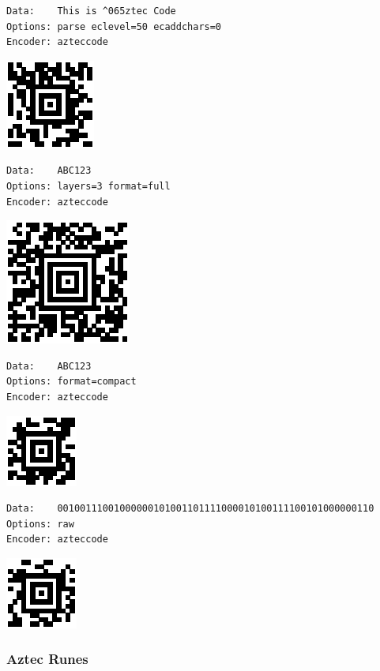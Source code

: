\begin{verbatim}
Data:    This is ^065ztec Code
Options: parse eclevel=50 ecaddchars=0
Encoder: azteccode
\end{verbatim}

\includegraphics{images/aztec-6.eps}

\begin{verbatim}
Data:    ABC123
Options: layers=3 format=full
Encoder: azteccode
\end{verbatim}

\includegraphics{images/aztec-2.eps}

\begin{verbatim}
Data:    ABC123
Options: format=compact
Encoder: azteccode
\end{verbatim}

\includegraphics{images/aztec-5.eps}

\begin{verbatim}
Data:    00100111001000000101001101111000010100111100101000000110
Options: raw
Encoder: azteccode
\end{verbatim}

\includegraphics{images/aztec-4.eps}

\hypertarget{aztec-runes}{%
\subsubsection{Aztec Runes}\label{aztec-runes}}

